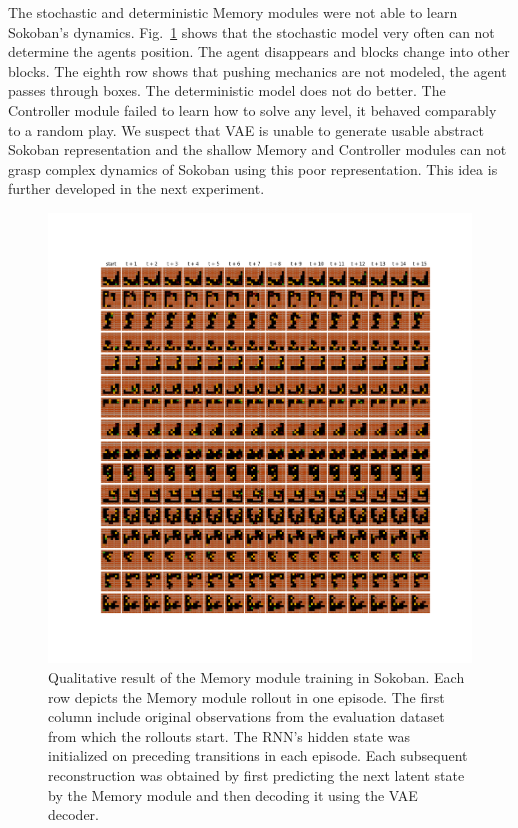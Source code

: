 The stochastic and deterministic Memory modules were not able to learn Sokoban’s dynamics. Fig.~\ref{Fig.WM_Sokoban_memory} shows that the stochastic model very often can not determine the agents position. The agent disappears and blocks change into other blocks. The eighth row shows that pushing mechanics are not modeled, the agent passes through boxes. The deterministic model does not do better.
The Controller module failed to learn how to solve any level, it behaved comparably to a random play. We suspect that VAE is unable to generate usable abstract Sokoban representation and the shallow Memory and Controller modules can not grasp complex dynamics of Sokoban using this poor representation. This idea is further developed in the next experiment.

\begin{figure}[H]
\includegraphics[width=1\textwidth,keepaspectratio]{figures/Sokoban_memory.png}
\caption[Qualitative result of the World Models' Memory module training in Sokoban]{Qualitative result of the Memory module training in Sokoban. Each row depicts the Memory module rollout in one episode. The first column include original observations from the evaluation dataset from which the rollouts start. The RNN's hidden state was initialized on preceding transitions in each episode. Each subsequent reconstruction was obtained by first predicting the next latent state by the Memory module and then decoding it using the VAE decoder.}
\label{Fig.WM_Sokoban_memory}
\end{figure}

